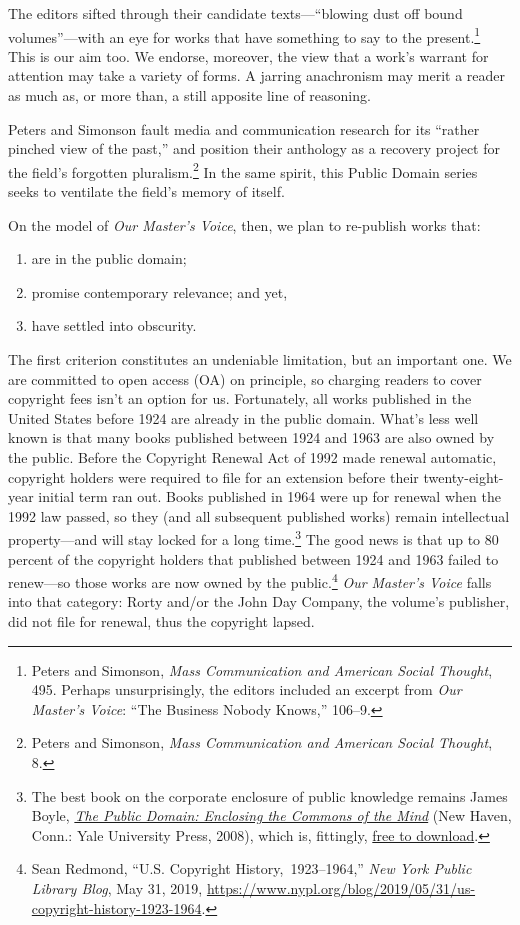 \documentclass[nohyper,openany,nobib]{tufte-book}
\begin{document}
\noindent The editors sifted through their candidate texts---``blowing dust off
bound volumes''---with an eye for works that have something to say to
the present.\footnote{Peters and Simonson, \emph{Mass Communication and American Social
  Thought}, 495. Perhaps unsurprisingly, the editors included an excerpt
  from \emph{Our Master's Voice}: ``The Business Nobody Knows,'' 106--9.} This is our aim too. We endorse, moreover, the view that
a work's warrant for attention may take a variety of forms. A jarring
anachronism may merit a reader as much as, or more than, a still
apposite line of reasoning.

Peters and Simonson fault media and communication research for its
``rather pinched view of the past,'' and position their anthology as a
recovery project for the field's forgotten pluralism.\footnote{Peters and Simonson, \emph{Mass Communication and American Social
  Thought}, 8.} In the same
spirit, this Public Domain series seeks to ventilate the field's memory
of itself.

On the model of \emph{Our Master's Voice}, then, we plan to re-publish
works that:

\begin{enumerate}[leftmargin=3\parindent]
\item
  are in the public domain;
\item
  promise contemporary relevance; and yet,
\item
  have settled into obscurity.
\end{enumerate}

\noindent The first criterion constitutes an undeniable limitation, but an
important one. We are committed to open access (OA) on principle, so
charging readers to cover copyright fees isn't an option for us.
Fortunately, all works published in the United States before 1924 are
already in the public domain. What's less well known is that many books
published between 1924 and 1963 are also owned by the public. Before the
Copyright Renewal Act of 1992 made renewal automatic, copyright holders
were required to file for an extension before their twenty-eight-year
initial term ran out. Books published in 1964 were up for renewal when
the 1992 law passed, so they (and all subsequent published works) remain
intellectual property---and will stay locked for a long time.\footnote{The best book on the corporate enclosure of public knowledge remains
  James Boyle, \emph{\href{http://www.worldcat.org/oclc/317471891}{The
  Public Domain: Enclosing the Commons of the Mind}} (New Haven, Conn.:
  Yale University Press, 2008), which is, fittingly,
  \href{http://www.thepublicdomain.org/download/}{free to download}.} The
good news is that up to 80 percent of the copyright holders that
published between 1924 and 1963 failed to renew---so those works are now
owned by the public.\footnote{Sean Redmond, ``U.S. Copyright History,~1923--1964,'' \emph{New York
  Public Library Blog}, May 31, 2019,
  \url{https://www.nypl.org/blog/2019/05/31/us-copyright-history-1923-1964}.} \emph{Our Master's Voice} falls into that
category: Rorty and/or the John Day Company, the volume's publisher, did
not file for renewal, thus the copyright lapsed.
\end{document}
